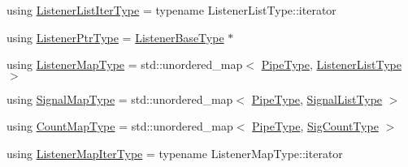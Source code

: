 \begin{DoxyCompactItemize}
using \hyperlink{structvt_1_1pipe_1_1signal_1_1_signal_holder_af0d3ccf4a8700979f414a0485cf41df5}{Listener\+List\+Iter\+Type} = typename Listener\+List\+Type\+::iterator
\item 
using \hyperlink{structvt_1_1pipe_1_1signal_1_1_signal_holder_a68114d1ad5804c71e014736b18e41e08}{Listener\+Ptr\+Type} = \hyperlink{structvt_1_1pipe_1_1signal_1_1_signal_holder_a84b564235f6d400782769c94a75d6622}{Listener\+Base\+Type} $\ast$
\item 
using \hyperlink{structvt_1_1pipe_1_1signal_1_1_signal_holder_a47bf4c2ab16e94467e6e5d3a29820276}{Listener\+Map\+Type} = std\+::unordered\+\_\+map$<$ \hyperlink{namespacevt_ac9852acda74d1896f48f406cd72c7bd3}{Pipe\+Type}, \hyperlink{structvt_1_1pipe_1_1signal_1_1_signal_holder_ae37fd15e6a901de2f90620780e936f6e}{Listener\+List\+Type} $>$
\item 
using \hyperlink{structvt_1_1pipe_1_1signal_1_1_signal_holder_a064e16bdc96f93675bc7fb967121a527}{Signal\+Map\+Type} = std\+::unordered\+\_\+map$<$ \hyperlink{namespacevt_ac9852acda74d1896f48f406cd72c7bd3}{Pipe\+Type}, \hyperlink{structvt_1_1pipe_1_1signal_1_1_signal_holder_ab04d27c1c48b28813fdd8af29a4cda92}{Signal\+List\+Type} $>$
\item 
using \hyperlink{structvt_1_1pipe_1_1signal_1_1_signal_holder_ade6904d6f651a864bf2e5a657a4b1a13}{Count\+Map\+Type} = std\+::unordered\+\_\+map$<$ \hyperlink{namespacevt_ac9852acda74d1896f48f406cd72c7bd3}{Pipe\+Type}, \hyperlink{structvt_1_1pipe_1_1signal_1_1_signal_holder_aced54515f402b63f6dea174e5b027c81}{Sig\+Count\+Type} $>$
\item 
using \hyperlink{structvt_1_1pipe_1_1signal_1_1_signal_holder_a7f6eed09a10f9b4f679c99ae85983879}{Listener\+Map\+Iter\+Type} = typename Listener\+Map\+Type\+::iterator
\end{DoxyCompactItemize}
